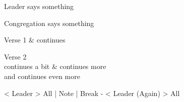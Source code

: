 \documentclass{liturgy}
\begin{document}
\begin{leader}
Leader says something
\end{leader}

\begin{all}
Congregation says something
\end{all}

\begin{canticle}
  Verse 1 & continues

  Verse 2 \\ continues a bit & continues more \\ and continues even more
\end{canticle}

\begin{responses}
  < Leader
  > All
  | Note
  | Break
  -
  < Leader (Again)
  > All
\end{responses}
\end{document}
